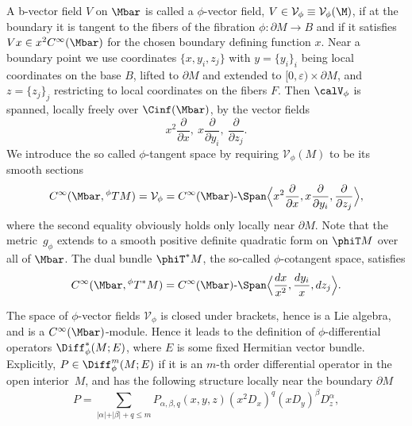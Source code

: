 \begin{defn}\label{Phi-vector-def}
A b-vector field $V$ on $\Mbar$ is called a $\phi$-vector field, $V\in\mathcal{V}_{\phi}\equiv \mathcal{V}_{\phi}(\M)$, if at the boundary it is tangent to the fibers of the fibration
$\phi: \partial M \to B$ and if it satisfies $Vx \in x^{2}C^{\infty}(\Mbar)$ for the chosen boundary defining function $x$. Near a boundary point we use coordinates
$\{x,y_i,z_j\}$ with $y = \{y_i\}_i$
being local coordinates on the base $B$, lifted to $\partial M$ and extended to
$[0,\varepsilon) \times \partial M$, and $z=\{z_j\}_j$ restricting to local coordinates on the fibers $F$. Then $\calV_\phi$ is spanned, locally freely over $\Cinf(\Mbar)$, by the vector fields
\[
x^{2}\frac{\partial}{\partial x},\ x\frac{\partial}{\partial y_{i}},\ \frac{\partial}{\partial z_{j}}.
\]
We introduce the so called $\phi$-tangent space by requiring $\mathcal{V}_{\phi}(M)$
to be its smooth sections
\begin{equation*}
C^\infty(\Mbar, {}^\phi TM) = \mathcal{V}_{\phi}
= C^\infty(\Mbar)\text{-}\Span\Bigl\langle x^{2}\frac{\partial}{\partial x},
x\frac{\partial}{\partial y_{i}}, \frac{\partial}{\partial z_{j}}\Bigr\rangle,
\end{equation*}
where the second equality obviously holds only locally near $\partial M$.
Note that the metric~$g_\phi$ extends to a smooth positive definite quadratic form on $\phiT M$ over all of $\Mbar$.
The dual bundle $\phiT^{*} M$, the so-called $\phi$-cotangent space, satisfies
\begin{equation*}
C^\infty(\Mbar, {}^\phi T^*M) =
C^\infty(\Mbar)\text{-}\Span\Bigl\langle \frac{dx}{x^{2}}, \frac{dy_{i}}{x},dz_{j}\Bigr\rangle.
\end{equation*}
\end{defn}
The space of $\phi$-vector fields $\mathcal{V}_{\phi}$ is closed under brackets, hence is a Lie algebra,
and is a $C^{\infty}(\Mbar)$-module. Hence it leads to the definition of
$\phi$-differential opera\-tors $\Diff_{\phi}^{*}(M; E)$, where $E$ is some fixed Hermitian vector bundle.
Explicitly, \hbox{$P \in \Diff_{\phi}^{m}(M; E)$} if it is an $m$-th order differential operator
in the open interior~$M$, and has the following structure locally near
the boundary $\partial M$
\begin{equation}\label{diff-phi}
P = \sum_{\vert \alpha \vert + \vert \beta \vert + q \leq m}
P_{\alpha,\beta,q}(x,y,z)(x^{2}D_{x})^{q}(xD_{y})^\beta D_{z}^{\alpha},
\end{equation}
